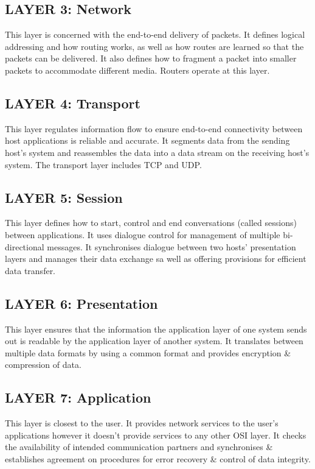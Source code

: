 \subsection*{LAYER 3: Network}
This layer is concerned with the end-to-end delivery of packets. It defines logical addressing and how routing works, as well as how routes are learned so that the packets can be delivered. It also defines how to fragment a packet into smaller packets to accommodate different media. Routers operate at this layer.

\subsection*{LAYER 4: Transport}
This layer regulates information flow to ensure end-to-end connectivity between host applications is reliable and accurate. It segments data from the sending host's system and reassembles the data into a data stream on the receiving host's system. The transport layer includes TCP and UDP.

\subsection*{LAYER 5: Session}
This layer defines how to start, control and end conversations (called sessions) between applications. It uses dialogue control for management of multiple bi-directional messages. It synchronises dialogue between two hosts' presentation layers and manages their data exchange sa well as offering provisions for efficient data transfer.

\subsection*{LAYER 6: Presentation}
This layer ensures that the information the application layer of one system sends out is readable by the application layer of another system. It translates between multiple data formats by using a common format and provides encryption \& compression of data.

\subsection*{LAYER 7: Application}
This layer is closest to the user. It provides network services to the user's applications however it doesn't provide services to any other OSI layer. It checks the availability of intended communication partners and synchronises \& establishes agreement on procedures for error recovery \& control of data integrity.
